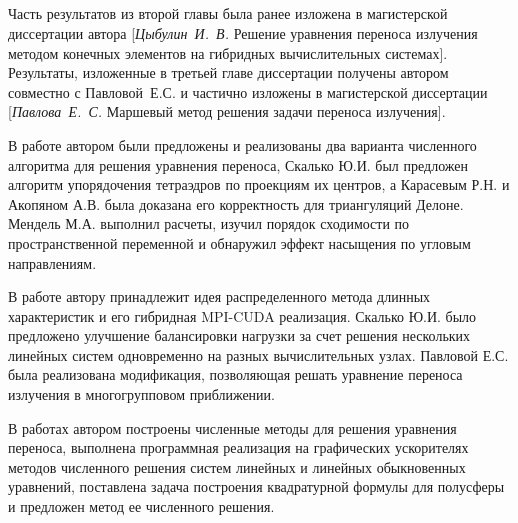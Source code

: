 \renewcommand{\refname}{\large Публикации автора по теме диссертации}
\nocite{*}
\insertbiblioauthor                          %

\subsection*{\contribution}
Часть результатов из второй главы была ранее изложена в магистерской диссертации автора [\emph{Цыбулин~И.~В.} Решение уравнения переноса излучения методом конечных элементов на гибридных вычислительных системах]. Результаты, изложенные в третьей главе диссертации получены автором совместно с Павловой~Е.С. и частично изложены в магистерской диссертации [\emph{Павлова~Е.~С.} Маршевый метод решения задачи переноса излучения].

В работе \cite{skalko2014} автором были предложены и реализованы два варианта численного алгоритма для решения уравнения переноса, Скалько Ю.И. был предложен алгоритм упорядочения тетраэдров по проекциям их центров, а Карасевым Р.Н. и Акопяном А.В. была доказана его корректность для триангуляций Делоне. Мендель М.А. выполнил расчеты, изучил порядок сходимости по пространственной переменной и обнаружил эффект насыщения по угловым направлениям.

В работе \cite{tsybulin2015a} автору принадлежит идея распределенного метода длинных характеристик и его гибридная MPI-CUDA реализация. Скалько Ю.И. было предложено улучшение балансировки нагрузки за счет решения нескольких линейных систем одновременно на разных вычислительных узлах. Павловой Е.С. была реализована модификация, позволяющая решать уравнение переноса излучения в многогрупповом приближении.

В работах \cite{tsybulin2015b, miptconf55, miptconf56, miptconf57, miptconf54} автором построены численные методы для решения уравнения переноса, выполнена программная реализация на графических ускорителях методов численного решения систем линейных и линейных обыкновенных уравнений, поставлена задача построения квадратурной формулы для полусферы и предложен метод ее численного решения. 